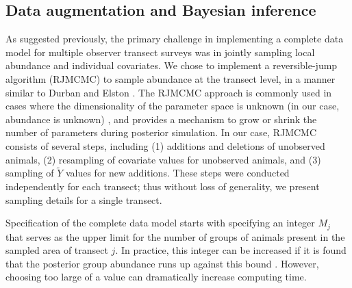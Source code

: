 \documentclass[10pt]{article}
\begin{document}
\subsection*{Data augmentation and Bayesian inference}

As suggested previously, the primary challenge in implementing a complete data model for multiple observer transect surveys was in jointly sampling local abundance and individual covariates.  We chose to implement a reversible-jump algorithm (RJMCMC) to sample abundance at the transect level, in a manner similar to Durban and Elston \cite{DurbanElston2005}. The RJMCMC approach is commonly used in cases where the dimensionality of the parameter space is unknown (in our case, abundance is unknown) \cite{Green1995}, and provides a mechanism to grow or shrink the number of parameters during posterior simulation. In our case, RJMCMC consists of several steps, including (1) additions and deletions of unobserved animals, (2) resampling of covariate values for unobserved animals, and (3) sampling of $\tilde{Y}$ values for new additions. These steps were conducted independently for each transect; thus without loss of generality, we present sampling details for a single transect.

Specification of the complete data model starts with specifying an integer $M_j$ that serves as the upper limit for the number of groups of animals present in the sampled area of transect $j$. In practice, this integer can be increased if it is found that the posterior group abundance runs up against this bound \cite{DurbanElston2005,RoyleEtAl2007b}. However, choosing too large of a value can dramatically increase computing time.
\end{document}
